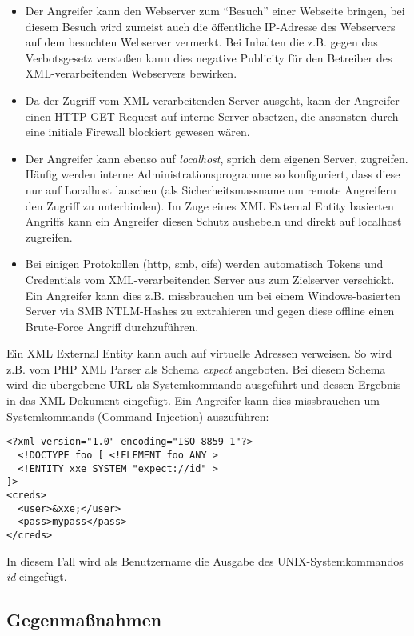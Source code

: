 \begin{itemize}
	\item Der Angreifer kann den Webserver zum ``Besuch'' einer Webseite bringen, bei diesem Besuch wird zumeist auch die öffentliche IP-Adresse des Webservers auf dem besuchten Webserver vermerkt. Bei Inhalten die z.B. gegen das Verbotsgesetz verstoßen kann dies negative Publicity für den Betreiber des XML-verarbeitenden Webservers bewirken.
	\item Da der Zugriff vom XML-verarbeitenden Server ausgeht, kann der Angreifer einen HTTP GET Request auf interne Server absetzen, die ansonsten durch eine initiale Firewall blockiert gewesen wären.
	\item Der Angreifer kann ebenso auf \textit{localhost}, sprich dem eigenen Server, zugreifen. Häufig werden interne Administrationsprogramme so konfiguriert, dass diese nur auf Localhost lauschen (als Sicherheitsmassname um remote Angreifern den Zugriff zu unterbinden). Im Zuge eines XML External Entity basierten Angriffs kann ein Angreifer diesen Schutz aushebeln und direkt auf localhost zugreifen.
	\item Bei einigen Protokollen (http, smb, cifs) werden automatisch Tokens und Credentials vom XML-verarbeitenden Server aus zum Zielserver verschickt. Ein Angreifer kann dies z.B. missbrauchen um bei einem Windows-basierten Server via SMB NTLM-Hashes zu extrahieren und gegen diese offline einen Brute-Force Angriff durchzuführen.
\end{itemize}

Ein XML External Entity kann auch auf virtuelle Adressen verweisen. So wird z.B. vom PHP XML Parser als Schema \textit{expect} angeboten. Bei diesem Schema wird die übergebene URL als Systemkommando ausgeführt und dessen Ergebnis in das XML-Dokument eingefügt. Ein Angreifer kann dies missbrauchen um Systemkommands (Command Injection) auszuführen:

\begin{verbatim}
<?xml version="1.0" encoding="ISO-8859-1"?>
  <!DOCTYPE foo [ <!ELEMENT foo ANY >
  <!ENTITY xxe SYSTEM "expect://id" >
]>
<creds>
  <user>&xxe;</user>
  <pass>mypass</pass>
</creds>
\end{verbatim}

In diesem Fall wird als Benutzername die Ausgabe des UNIX-Systemkommandos \textit{id} eingefügt.

\subsection{Gegenmaßnahmen}

